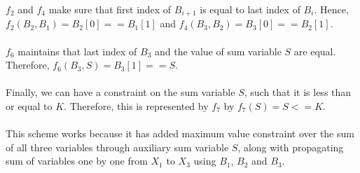 \documentclass[12pt]{article}
\begin{document}
\begin{enumerate}[label=(\alph*)]
  $f_2$ and $f_4$ make sure that first index of $B_{i+1}$ is equal to last index of $B_{i}$. Hence, $f_2(B_2, B_1) = B_2[0] == B_1[1]$ and $f_4(B_3, B_2) = B_3[0] == B_2[1]$. \\ \\
  $f_6$ maintains that last index of $B_3$ and the value of sum variable $S$ are equal. Therefore, $f_6(B_3, S) = B_3[1] == S$. \\ \\
  Finally, we can have a constraint on the sum variable $S$, such that it is less than or equal to $K$. Therefore, this is represented by $f_7$ by $f_7(S) = S <= K$. \\\\
  This scheme works because it has added maximum value constraint over the sum of all three variables through auxiliary sum variable $S$, along with propagating sum of variables one by one from $X_1$ to $X_3$ using $B_1$, $B_2$ and $B_3$.
\end{enumerate}
\end{document}
